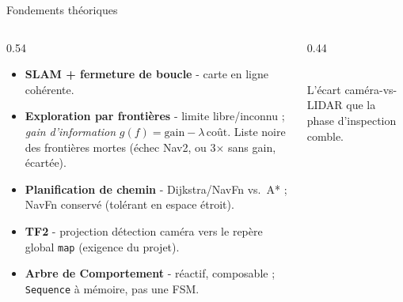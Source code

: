\documentclass[aspectratio=169,11pt]{beamer}
\begin{document}
\begin{frame}{Fondements théoriques}
  \begin{columns}[T]
  \begin{column}{0.54\linewidth}
  {\small\begin{itemize}
    \item \textbf{SLAM + fermeture de boucle} - carte en ligne cohérente.
    \item \textbf{Exploration par frontières} - limite libre/inconnu ; \emph{gain d'information}
      $g(f)=\text{gain}-\lambda\,\text{coût}$. Liste noire des frontières mortes (échec Nav2, ou 3$\times$ sans gain, écartée).
    \item \textbf{Planification de chemin} - Dijkstra/NavFn vs.\ A* ; NavFn conservé (tolérant en espace étroit).
    \item \textbf{TF2} - projection détection caméra vers le repère global \texttt{map} (exigence du projet).
    \item \textbf{Arbre de Comportement} - réactif, composable ; \texttt{Sequence} à mémoire, pas une FSM.
  \end{itemize}}
  \end{column}
  \begin{column}{0.44\linewidth}
  \centering
  \\
  {\scriptsize L'écart caméra-vs-LIDAR que la phase d'inspection comble.}
  \end{column}
  \end{columns}
\end{frame}
\end{document}
